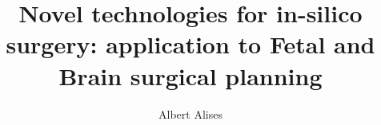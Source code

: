 \documentclass[a4paper,12pt,twoside]{report}
\begin{document}

\title{ {\bf \fontsize{24.88}{40}\selectfont Novel technologies for in-silico surgery: application to Fetal and Brain surgical planning }\\
}

\author{\fontsize{14}{27}\selectfont Albert Alises}

\maketitle

\restoregeometry

\preface



\body





\listoffigures
\appendix



\end{document}
